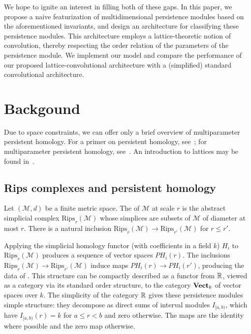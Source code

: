 \documentclass{article}
\begin{document}
We hope to ignite an interest in filling both of these gaps. In this paper, we
propose a naive featurization of multidimensional persistence modules based on
the aforementioned invariants, and design an architecture for classifying these
persistence modules. This architecture employs a lattice-theoretic notion of
convolution, thereby respecting the order relation of the parameters of the
persistence module. We implement our model and compare the performance of our
proposed lattice-convolutional architecture with a (simplified) standard
convolutional architecture.

\section{Backgound}

Due to space constraints, we can offer only a brief overview of multiparameter
persistent homology. For a primer on persistent homology,
see~\cite{ghrist_barcodes:_2008, carlsson_topology_2009}; for multiparameter
persistent homology, see~\cite{lesnick_interactive_2015}. An introduction to
lattices may be found in~\cite{davey2002introduction}.

\subsection{Rips complexes and persistent homology}
Let $(\mathcal M,d)$ be a finite metric space. The  of $\mathcal M$ at scale $r$ is the abstract simplicial complex
$\text{Rips}_r(\mathcal M)$ whose simplices are subsets of $\mathcal M$ of
diameter at most $r$. There is a natural inclusion $\text{Rips}_r(\mathcal M)
\to \text{Rips}_{r'}(\mathcal M)$ for $r \leq r'$.

Applying the simplicial homology functor (with coefficients in a field $k$)
$H_i$ to $\text{Rips}_r(\mathcal M)$ produces a sequence of vector spaces
$PH_i(r)$. The inclusions $\text{Rips}_r(\mathcal M) \to
\text{Rips}_{r'}(\mathcal M)$ induce maps $PH_i(r) \to PH_i(r')$, producing the
data of . This structure can be compactly
described as a functor from $\mathbb{R}$, viewed as a category via its standard order
structure, to the category $\operatorname{\mathbf{Vect}}_k$ of vector spaces over $k$. The simplicity
of the category $\mathbb{R}$ gives these persistence modules simple structure: they
decompose as direct sums of interval modules $I_{[a,b)}$, which have
$I_{[a,b)}(r) = k$ for $a \leq r < b$ and zero otherwise. The maps are the
identity where possible and the zero map otherwise.
\end{document}
